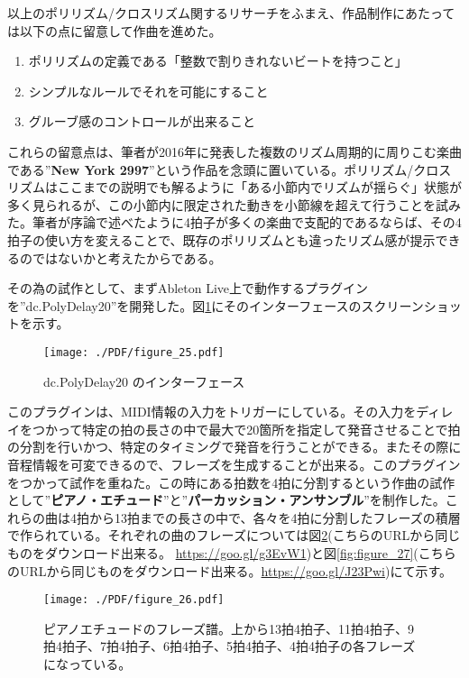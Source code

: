 \documentclass[uplatex,dvipdfmx]{ujarticle}
\begin{document}
以上のポリリズム/クロスリズム関するリサーチをふまえ、作品制作にあたっては以下の点に留意して作曲を進めた。

\begin{enumerate}
  \item ポリリズムの定義である「整数で割りきれないビートを持つこと」
  \item シンプルなルールでそれを可能にすること
	\item グルーブ感のコントロールが出来ること
\end{enumerate}

これらの留意点は、筆者が2016年に発表した複数のリズム周期的に周りこむ楽曲である''{\bf New York 2997}''\cite{yamato:05}という作品を念頭に置いている。ポリリズム/クロスリズムはここまでの説明でも解るように「ある小節内でリズムが揺らぐ」状態が多く見られるが、この小節内に限定された動きを小節線を超えて行うことを試みた。筆者が序論で述べたように4拍子が多くの楽曲で支配的であるならば、その4拍子の使い方を変えることで、既存のポリリズムとも違ったリズム感が提示できるのではないかと考えたからである。

その為の試作として、まずAbleton Live上で動作するプラグインを''dc.PolyDelay20''を開発した。図\ref{fig:figure_25}にそのインターフェースのスクリーンショットを示す。

\begin{figure}[ht]
\centerline{
	\texttt{[image: ./PDF/figure\_25.pdf]}
}
\caption{dc.PolyDelay20 のインターフェース}
\label{fig:figure_25}
\end{figure}

このプラグインは、MIDI情報の入力をトリガーにしている。その入力をディレイをつかって特定の拍の長さの中で最大で20箇所を指定して発音させることで拍の分割を行いかつ、特定のタイミングで発音を行うことができる。またその際に音程情報を可変できるので、フレーズを生成することが出来る。このプラグインをつかって試作を重ねた。この時にある拍数を4拍に分割するという作曲の試作として''{\bf ピアノ・エチュード}''\cite{yamato:06}と''{\bf パーカッション・アンサンブル}''\cite{yamato:07}を制作した。これらの曲は4拍から13拍までの長さの中で、各々を4拍に分割したフレーズの積層で作られている。それぞれの曲のフレーズについては図\ref{fig:figure_26}(こちらのURLから同じものをダウンロード出来る。 \url{https://goo.gl/g3EvW1})と図\ref{fig:figure_27}(こちらのURLから同じものをダウンロード出来る。\url{https://goo.gl/J23Pwi})にて示す。

\begin{figure}[ht]
\centerline{
	\texttt{[image: ./PDF/figure\_26.pdf]}
}
\caption{ピアノエチュードのフレーズ譜。上から13拍4拍子、11拍4拍子、9拍4拍子、7拍4拍子、6拍4拍子、5拍4拍子、4拍4拍子の各フレーズになっている。}
\label{fig:figure_26}
\end{figure}
\end{document}
